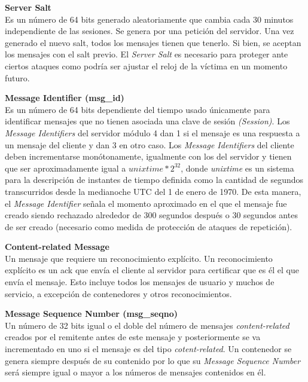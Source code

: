 \begin{description}
	\item  \textbf{Server Salt}\\
	Es un número de 64 bits generado aleatoriamente que cambia cada 30 minutos independiente de las sesiones. Se genera por una petición del servidor. Una vez generado el nuevo salt, todos los mensajes tienen que tenerlo. Si bien, se aceptan los mensajes con el salt previo. El \emph{Server Salt} es necesario para proteger ante ciertos ataques como podría ser ajustar el reloj de la víctima en un momento futuro.

	\item \textbf{Message Identifier (msg\_id)}\\
	Es un número de 64 bits dependiente del tiempo usado únicamente para identificar mensajes que no tienen asociada una clave de sesión \emph{(Session)}. Los \emph{Message Identifiers} del servidor módulo 4 dan 1 si el mensaje es una respuesta a un mensaje del cliente y dan 3 en otro caso. 
	Los \emph{Message Identifiers} del cliente deben incrementarse monótonamente, igualmente con los del servidor y tienen que ser aproximadamente igual a $unixtime*2^{32}$, donde \emph{unixtime} es un sistema para la descripción de instantes de tiempo definida como la cantidad de segundos transcurridos desde la medianoche UTC del 1 de enero de 1970. 
	De esta manera, el \emph{Message Identifier} señala el momento aproximado en el que el mensaje fue creado siendo rechazado alrededor de 300 segundos después o 30 segundos antes de ser creado (necesario como medida de protección de ataques de repetición).  

	\item \textbf{Content-related Message}\\
	Un mensaje que requiere un reconocimiento explícito. Un reconocimiento explícito es un ack que envía el cliente al servidor para certificar que es él el que envía el mensaje. Esto incluye todos los mensajes de usuario y muchos de servicio, a excepción de contenedores y otros reconocimientos.

	\item \textbf{Message Sequence Number (msg\_seqno)}\\
	Un número de 32 bits igual o el doble del número de mensajes \emph{content-related} creados por el remitente antes de este mensaje y posteriormente se va incrementado en uno si el mensaje es del tipo \emph{cotent-related}. Un contenedor se genera siempre después de su contenido por lo que su \emph{Message Sequence Number} será siempre igual o mayor a los números de mensajes contenidos en él.


\end{description}

